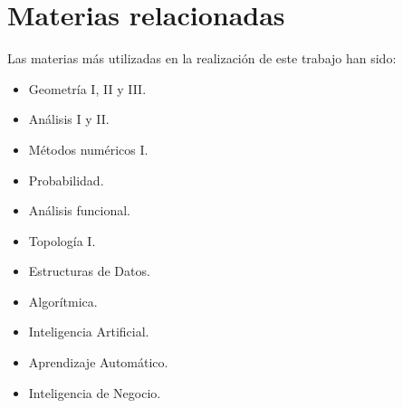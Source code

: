 \section{Materias relacionadas}

Las materias más utilizadas en la realización de este trabajo han sido:
\begin{itemize}
\item Geometría I, II y III.
\item Análisis I y II.
\item Métodos numéricos I.
\item Probabilidad.
\item Análisis funcional.
\item Topología I.
\item Estructuras de Datos.
\item Algorítmica.
\item Inteligencia Artificial.
\item Aprendizaje Automático.
\item Inteligencia de Negocio.
\end{itemize}